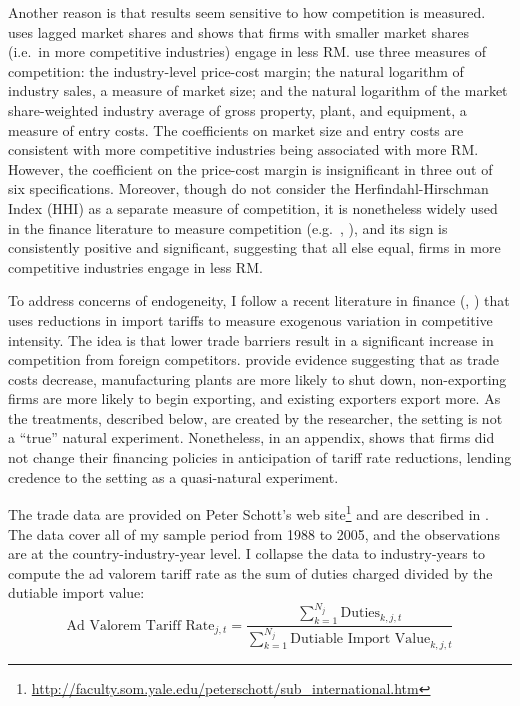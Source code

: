 \documentclass[notitlepage, 12pt]{article}
\begin{document}
\noindent Another reason is that results seem sensitive to how competition is measured. \citet{zang:2012} uses lagged market shares and shows that firms with smaller market shares (i.e.\ in more competitive industries) engage in less RM. \citet{kst:2012} use three measures of competition: the industry-level price-cost margin; the natural logarithm of industry sales, a measure of market size; and the natural logarithm of the market share-weighted industry average of gross property, plant, and equipment, a measure of entry costs. The coefficients on market size and entry costs are consistent with more competitive industries being associated with more RM. However, the coefficient on the price-cost margin is insignificant in three out of six specifications. Moreover, though \citeauthor{kst:2012} do not consider the Herfindahl-Hirschman Index (HHI) as a separate measure of competition, it is nonetheless widely used in the finance literature to measure competition (e.g.\ \citet{hr:2006}, \citet{gm:2010,gm:2011}), and its sign is consistently positive and significant, suggesting that all else equal, firms in more competitive industries engage in less RM.
\newline

\noindent To address concerns of endogeneity, I follow a recent literature in finance (\citet{fresard:2010}, \citet{valta:2012}) that uses reductions in import tariffs to measure exogenous variation in competitive intensity. %
The idea is that lower trade barriers result in a significant increase in competition from foreign competitors. \citet*{bjs:2006} provide evidence suggesting that as trade costs decrease, manufacturing plants are more likely to shut down, non-exporting firms are more likely to begin exporting, and existing exporters export more. As the treatments, described below, are created by the researcher, the setting is not a ``true'' natural experiment. Nonetheless, in an appendix, \citeauthor{valta:2012} shows that firms did not change their financing policies in anticipation of tariff rate reductions, lending credence to the setting as a quasi-natural experiment.
\newline

\noindent The trade data are provided on Peter Schott's web site\footnote{\url{http://faculty.som.yale.edu/peterschott/sub_international.htm}} and are described in \citet{schott:2010}. The data cover all of my sample period from 1988 to 2005, and the observations are at the country-industry-year level. I collapse the data to industry-years to compute the ad valorem tariff rate as the sum of duties charged divided by the dutiable import value:
\[\text{Ad Valorem Tariff Rate}_{j,t} = \dfrac{\sum_{k=1}^{N_{j}}\text{Duties}_{k,j,t}}{\sum_{k=1}^{N_{j}}\text{Dutiable Import Value}_{k,j,t}}\]
\end{document}

